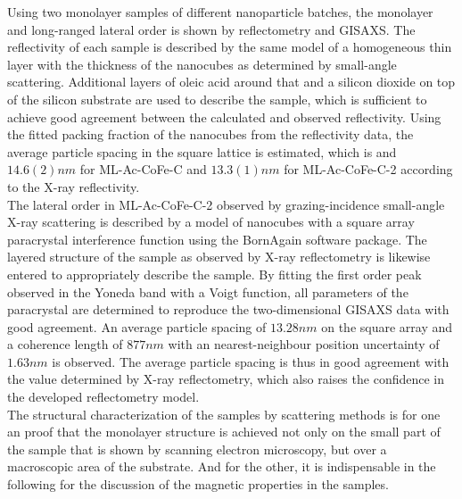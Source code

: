 \documentclass[\main/dresen_thesis.tex]{subfiles}
\begin{document}
  \label{sec:monolayers:structuralCharacterization:summary}
  Using two monolayer samples of different nanoparticle batches, the monolayer and long-ranged lateral order is shown by reflectometry and GISAXS.
  The reflectivity of each sample is described by the same model of a homogeneous thin layer with the thickness of the nanocubes as determined by small-angle scattering.
  Additional layers of oleic acid around that and a silicon dioxide on top of the silicon substrate are used to describe the sample, which is sufficient to achieve good agreement between the calculated and observed reflectivity.
  Using the fitted packing fraction of the nanocubes from the reflectivity data, the average particle spacing in the square lattice is estimated, which is and $14.6(2) \unit{nm}$ for ML-Ac-CoFe-C and $13.3(1) \unit{nm}$ for ML-Ac-CoFe-C-2 according to the X-ray reflectivity.
  \\

  The lateral order in ML-Ac-CoFe-C-2 observed by grazing-incidence small-angle X-ray scattering is described by a model of nanocubes with a square array paracrystal interference function using the BornAgain software package.
  The layered structure of the sample as observed by X-ray reflectometry is likewise entered to appropriately describe the sample.
  By fitting the first order peak observed in the Yoneda band with a Voigt function, all parameters of the paracrystal are determined to reproduce the two-dimensional GISAXS data with good agreement.
  An average particle spacing of $13.28 \unit{nm}$ on the square array and a coherence length of $877 \unit{nm}$ with an nearest-neighbour position uncertainty of $1.63 \unit{nm}$ is observed.
  The average particle spacing is thus in good agreement with the value determined by X-ray reflectometry, which also raises the confidence in the developed reflectometry model.
  \\

  The structural characterization of the samples by scattering methods is for one an proof that the monolayer structure is achieved not only on the small part of the sample that is shown by scanning electron microscopy, but over a macroscopic area of the substrate.
  And for the other, it is indispensable in the following for the discussion of the magnetic properties in the samples.
\end{document}
